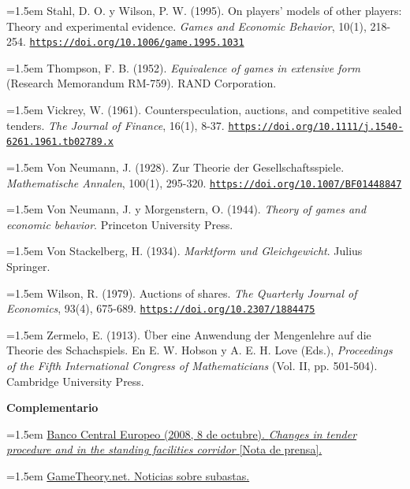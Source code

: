 \documentclass[10pt,a4paper]{article}
\begin{document}
\noindent\hangindent=1.5em Stahl, D. O. y Wilson, P. W. (1995). On players' models of other players: Theory and experimental evidence. \textit{Games and Economic Behavior}, 10(1), 218-254. \href{https://doi.org/10.1006/game.1995.1031}{\nolinkurl{https://doi.org/10.1006/game.1995.1031}}

\noindent\hangindent=1.5em Thompson, F. B. (1952). \textit{Equivalence of games in extensive form} (Research Memorandum RM-759). RAND Corporation.

\noindent\hangindent=1.5em Vickrey, W. (1961). Counterspeculation, auctions, and competitive sealed tenders. \textit{The Journal of Finance}, 16(1), 8-37. \href{https://doi.org/10.1111/j.1540-6261.1961.tb02789.x}{\nolinkurl{https://doi.org/10.1111/j.1540-6261.1961.tb02789.x}}

\noindent\hangindent=1.5em Von Neumann, J. (1928). Zur Theorie der Gesellschaftsspiele. \textit{Mathematische Annalen}, 100(1), 295-320. \href{https://doi.org/10.1007/BF01448847}{\nolinkurl{https://doi.org/10.1007/BF01448847}}

\noindent\hangindent=1.5em Von Neumann, J. y Morgenstern, O. (1944). \textit{Theory of games and economic behavior}. Princeton University Press.

\noindent\hangindent=1.5em Von Stackelberg, H. (1934). \textit{Marktform und Gleichgewicht}. Julius Springer.

\noindent\hangindent=1.5em Wilson, R. (1979). Auctions of shares. \textit{The Quarterly Journal of Economics}, 93(4), 675-689. \href{https://doi.org/10.2307/1884475}{\nolinkurl{https://doi.org/10.2307/1884475}}

\noindent\hangindent=1.5em Zermelo, E. (1913). Über eine Anwendung der Mengenlehre auf die Theorie des Schachspiels. En E. W. Hobson y A. E. H. Love (Eds.), \textit{Proceedings of the Fifth International Congress of Mathematicians} (Vol. II, pp. 501-504). Cambridge University Press.

\textbf{Complementario}

\noindent\hangindent=1.5em \href{https://www.ecb.europa.eu/press/pr/date/2008/html/pr081008_2.en.html}{Banco Central Europeo (2008, 8 de octubre). \textit{Changes in tender procedure and in the standing facilities corridor} [Nota de prensa].}

\noindent\hangindent=1.5em \href{https://www.gametheory.net/news/news.pl?Concept=Auc&highlight=AUC}{GameTheory.net. Noticias sobre subastas.}
\end{document}

